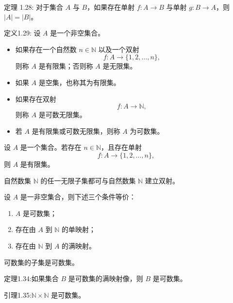 \begin{theorem}[双射等于等势]
定理 1.28:
对于集合 $A$ 与 $B$，如果存在单射 $f: A \to B$ 与单射 $g: B \to A$，则 $|A| = |B|$。
\end{theorem}
\begin{definition}[可数集]定义1.29:
设 $A$ 是一个非空集合。

\begin{itemize}
  \item 如果存在一个自然数 $n \in \mathbb{N}$ 以及一个双射
  \[
  f: A \to \{1,2,\dots,n\},
  \]
  则称 $A$ 是有限集；否则称 $A$ 是无限集。
  
  \item 如果 $A$ 是空集，也称其为有限集。
  
  \item 如果存在双射
  \[
  f: A \to \mathbb{N},
  \]
  则称 $A$ 是可数无限集。
  
  \item 若 $A$ 是有限集或可数无限集，则称 $A$ 为可数集。
\end{itemize}
\end{definition}

\begin{theorem}[   有限集判定]
设 $A$ 是一个集合。若存在 $n \in \mathbb{N}$，且存在单射
\[
f: A \to \{1,2,\dots,n\},
\]
则 $A$ 是有限集。
\end{theorem}
\begin{corollary}
自然数集 $\mathbb{N}$ 的任一无限子集都可与自然数集 $\mathbb{N}$ 建立双射。
\end{corollary}
\begin{corollary}
设 $A$ 是一非空集合，则下述三个条件等价：
\begin{enumerate}
  \item $A$ 是可数集；
  \item 存在由 $A$ 到 $\mathbb{N}$ 的单映射；
  \item 存在由 $\mathbb{N}$ 到 $A$ 的满映射。
\end{enumerate}
\end{corollary}

\begin{corollary}
可数集的子集是可数集。
\end{corollary}

\begin{theorem}
定理1.34:如果集合 $B$ 是可数集的满映射像，则 $B$ 是可数集。
\end{theorem}
\begin{lemma}
引理1.35:$\mathbb{N} \times \mathbb{N}$ 是可数集。
\end{lemma}

